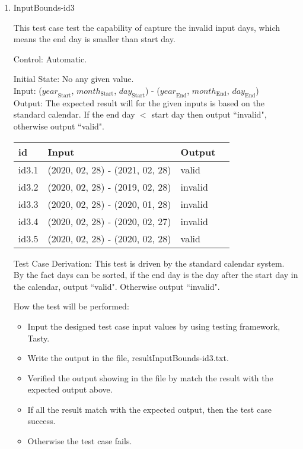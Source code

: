 \documentclass[12pt, titlepage]{article}
\begin{document}
\begin{enumerate}
\item{InputBounds-id3\\}

This test case test the capability of capture the invalid input days, which means the end day is smaller than start day.

Control: Automatic.
 
Initial State: No any given value.\\
Input: ($\mathit{year}_\text{Start}$, $\mathit{month}_\text{Start}$, $\mathit{day}_\text{Start}$) - ($\mathit{year}_\text{End}$, $\mathit{month}_\text{End}$, $\mathit{day}_\text{End}$)\\ 


Output: The expected result will for the given inputs is based on the standard calendar.
If the end day $<$ start day then output ``invalid", otherwise output ``valid".

\noindent \begin{tabular}{l l l l} 
    \toprule		
    \textbf{id} & \textbf{Input} & \textbf{Output}\\ 
	\midrule
   id3.1 & (2020, 02, 28) - (2021, 02, 28) & valid\\
   id3.2 & (2020, 02, 28) - (2019, 02, 28)  & invalid\\
   id3.3 & (2020, 02, 28) - (2020, 01, 28)  & invalid\\
   id3.4 & (2020, 02, 28) - (2020, 02, 27)  & invalid\\
   id3.5 & (2020, 02, 28) - (2020, 02, 28)  & valid\\
    \bottomrule
  \end{tabular}


Test Case Derivation: This test is driven by the standard calendar system.\\ By the fact days can be sorted, if the end day is the day after the start day in the  calendar, output ``valid". Otherwise output ``invalid".


How the test will be performed: 

\begin{itemize} 
\item Input the designed test case input values by using testing framework, Tasty. 
\item Write the output in the file, resultInputBounds-id3.txt.
\item Verified the output showing in the file by match the result with the expected output above.
\item If all the result match with the expected output, then the test case success.
\item Otherwise the test case fails.
\end{itemize}

\end{enumerate}
\end{document}
